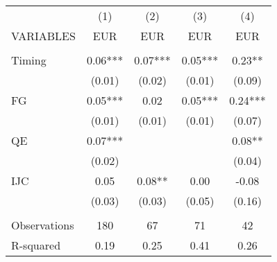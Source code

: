 \begin{tabular}{lcccc} \hline
 & (1) & (2) & (3) & (4) \\
VARIABLES & EUR & EUR & EUR & EUR \\ \hline
 &  &  &  &  \\
Timing & 0.06*** & 0.07*** & 0.05*** & 0.23** \\
 & (0.01) & (0.02) & (0.01) & (0.09) \\
FG & 0.05*** & 0.02 & 0.05*** & 0.24*** \\
 & (0.01) & (0.01) & (0.01) & (0.07) \\
QE & 0.07*** &  &  & 0.08** \\
 & (0.02) &  &  & (0.04) \\
IJC & 0.05 & 0.08** & 0.00 & -0.08 \\
 & (0.03) & (0.03) & (0.05) & (0.16) \\
 &  &  &  &  \\
Observations & 180 & 67 & 71 & 42 \\
 R-squared & 0.19 & 0.25 & 0.41 & 0.26 \\ \hline
\end{tabular}
